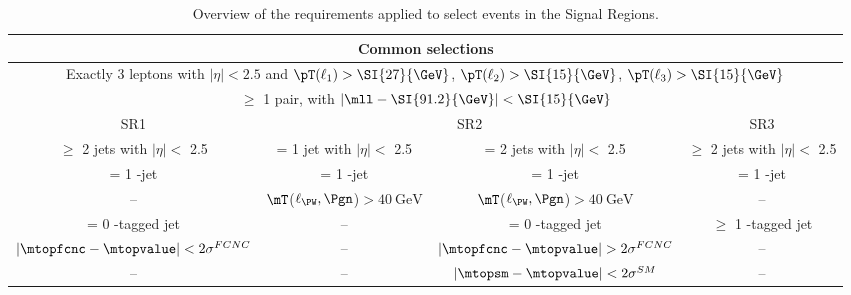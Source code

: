 \clearpage
\begin{table}
	\centering
	\begin{tabular}{c|c|c|c}
		\toprule
		\multicolumn{4}{c}{Common selections} \\
		\midrule
		\multicolumn{4}{c}{Exactly 3 leptons with $|\eta| < 2.5$ and $\pT(\ell_1)> \SI{27}{\GeV}$, $\pT(\ell_2)> \SI{15}{\GeV}$, $\pT(\ell_3)> \SI{15}{\GeV}$} \\
		\multicolumn{4}{c}{$\ge$ 1 \OSSF pair, with $|\mll - \SI{91.2}{\GeV}| < \SI{15}{\GeV}$} \\
		\midrule
		\midrule
		SR1\tZc & \multicolumn{2}{c|}{SR2\tZc} & SR3\tZc \\
		\midrule 
		$\ge$ 2 jets with $|\eta| < $ 2.5  & = 1 jet with $|\eta| < $ 2.5  & = 2 jets with $|\eta| < $ 2.5  & $\ge$ 2 jets with $|\eta| < $ 2.5 \\
		= 1 \Pqb-jet  & = 1 \Pqb-jet & = 1 \Pqb-jet & = 1 \Pqb-jet \\
		-- & $\mT$($\ell_{\PW},\Pgn$)$ > \SI{40}{\GeV}$ & $\mT$($\ell_{\PW},\Pgn$)$ > \SI{40}{\GeV}$ & -- \\
		= 0 \Pqc-tagged jet  & -- & = 0 \Pqc-tagged jet & $\ge$ 1 \Pqc-tagged jet \\
		$|\mtopfcnc - \mtopvalue| < 2\sigma^{FCNC}$ & -- & $|\mtopfcnc - \mtopvalue| > 2\sigma^{FCNC}$ & -- \\
		-- & -- & $|\mtopsm - \mtopvalue| < 2\sigma^{SM}$ & -- \\
		\bottomrule
	\end{tabular}
	\caption{
	Overview of the requirements applied to select events in the Signal Regions.
}%
\label{tab:sel:srs}
\end{table}
\clearpage
\FloatBarrier


